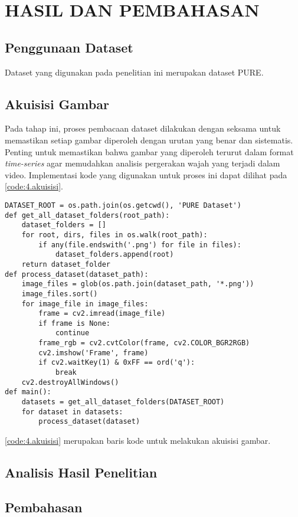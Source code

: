 \newpage
\chapter{HASIL DAN PEMBAHASAN} \label{Bab IV}

\section{Penggunaan Dataset} \label{IV.Penggunaan}
Dataset yang digunakan pada penelitian ini merupakan dataset PURE. 
\lipsum[1-2] %


\section{Akuisisi Gambar} \label{IV.Akuisisi}
Pada tahap ini, proses pembacaan dataset dilakukan dengan seksama untuk memastikan setiap gambar diperoleh dengan urutan yang benar dan sistematis. Penting untuk memastikan bahwa gambar yang diperoleh terurut dalam format \textit{time-series} agar memudahkan analisis pergerakan wajah yang terjadi dalam video. Implementasi kode yang digunakan untuk proses ini dapat dilihat pada \cref{code:4.akuisisi}. \par

\begin{lstlisting}[caption={Akuisisi Gambar}, label={code:4.akuisisi}, basicstyle=\ttfamily\scriptsize]
DATASET_ROOT = os.path.join(os.getcwd(), 'PURE Dataset')
def get_all_dataset_folders(root_path):
    dataset_folders = []
    for root, dirs, files in os.walk(root_path):
        if any(file.endswith('.png') for file in files):
            dataset_folders.append(root)
    return dataset_folder
def process_dataset(dataset_path):
    image_files = glob(os.path.join(dataset_path, '*.png'))
    image_files.sort()
    for image_file in image_files:
        frame = cv2.imread(image_file)
        if frame is None:
            continue
        frame_rgb = cv2.cvtColor(frame, cv2.COLOR_BGR2RGB)
        cv2.imshow('Frame', frame)
        if cv2.waitKey(1) & 0xFF == ord('q'):
            break
    cv2.destroyAllWindows()
def main():
    datasets = get_all_dataset_folders(DATASET_ROOT)
    for dataset in datasets:
        process_dataset(dataset)
\end{lstlisting}


\cref{code:4.akuisisi} merupakan baris kode untuk melakukan akuisisi gambar. 


\section{Analisis Hasil Penelitian} \label{IV.Analisis}
\lipsum[1-2] %


\section{Pembahasan} \label{IV.Bahas}
\lipsum[1-2] %
